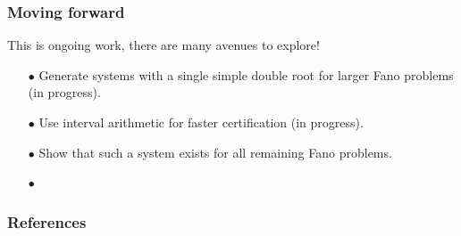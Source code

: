 \documentclass{beamer}
\theoremstyle{definition}
\begin{document}
\begin{frame}
\frametitle{Moving forward}
This is ongoing work, there are many avenues to explore!
\begin{enumerate}
\item[$\bullet$] Generate systems with a single simple double root for larger Fano problems (in progress).

\item[$\bullet$] Use interval arithmetic for faster certification (in progress).

\item[$\bullet$] Show that such a system exists for all remaining Fano problems.

\item[$\bullet$] 
\end{enumerate}
\end{frame}

\begin{frame}
\frametitle{References}

\end{frame}
\end{document}
